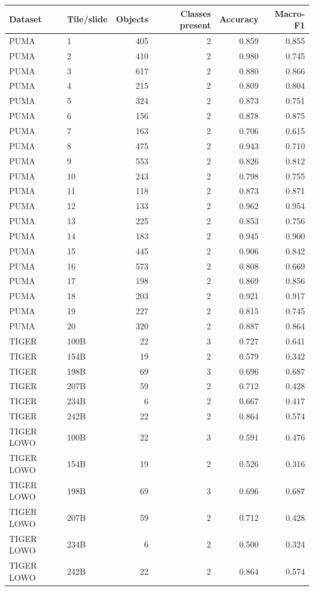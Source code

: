 \begin{tabular}{llrrrr}
\toprule
Dataset & Tile/slide & Objects & Classes present & Accuracy & Macro-F1 \\
\midrule
PUMA & 1 & 405 & 2 & 0.859 & 0.855 \\
PUMA & 2 & 410 & 2 & 0.980 & 0.745 \\
PUMA & 3 & 617 & 2 & 0.880 & 0.866 \\
PUMA & 4 & 215 & 2 & 0.809 & 0.804 \\
PUMA & 5 & 324 & 2 & 0.873 & 0.751 \\
PUMA & 6 & 156 & 2 & 0.878 & 0.875 \\
PUMA & 7 & 163 & 2 & 0.706 & 0.615 \\
PUMA & 8 & 475 & 2 & 0.943 & 0.710 \\
PUMA & 9 & 553 & 2 & 0.826 & 0.812 \\
PUMA & 10 & 243 & 2 & 0.798 & 0.755 \\
PUMA & 11 & 118 & 2 & 0.873 & 0.871 \\
PUMA & 12 & 133 & 2 & 0.962 & 0.954 \\
PUMA & 13 & 225 & 2 & 0.853 & 0.756 \\
PUMA & 14 & 183 & 2 & 0.945 & 0.900 \\
PUMA & 15 & 445 & 2 & 0.906 & 0.842 \\
PUMA & 16 & 573 & 2 & 0.808 & 0.669 \\
PUMA & 17 & 198 & 2 & 0.869 & 0.856 \\
PUMA & 18 & 203 & 2 & 0.921 & 0.917 \\
PUMA & 19 & 227 & 2 & 0.815 & 0.745 \\
PUMA & 20 & 320 & 2 & 0.887 & 0.864 \\
TIGER & 100B & 22 & 3 & 0.727 & 0.641 \\
TIGER & 154B & 19 & 2 & 0.579 & 0.342 \\
TIGER & 198B & 69 & 3 & 0.696 & 0.687 \\
TIGER & 207B & 59 & 2 & 0.712 & 0.428 \\
TIGER & 234B & 6 & 2 & 0.667 & 0.417 \\
TIGER & 242B & 22 & 2 & 0.864 & 0.574 \\
TIGER LOWO & 100B & 22 & 3 & 0.591 & 0.476 \\
TIGER LOWO & 154B & 19 & 2 & 0.526 & 0.316 \\
TIGER LOWO & 198B & 69 & 3 & 0.696 & 0.687 \\
TIGER LOWO & 207B & 59 & 2 & 0.712 & 0.428 \\
TIGER LOWO & 234B & 6 & 2 & 0.500 & 0.324 \\
TIGER LOWO & 242B & 22 & 2 & 0.864 & 0.574 \\
\bottomrule
\end{tabular}
